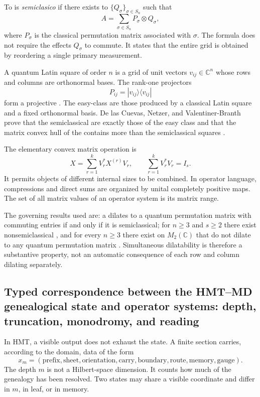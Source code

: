 To \QMS is \emph{semiclasico} if there exists to \POVM
\(\{Q_\sigma\}_{\sigma\in S_n}\) such that
\[
 A=\sum_{\sigma\in S_n}P_\sigma\otimes Q_\sigma,
 \tag{GMC-1.2}
\]
where $P_\sigma$ is the classical permutation matrix associated with
$\sigma$. The formula does not require the effects $Q_\sigma$ to commute. It states
that the entire grid is obtained by reordering a single primary measurement.

A quantum Latin square of order $n$ is a grid of unit
vectors $v_{ij}\in\mathbb C^n$ whose rows and columns are
orthonormal bases. The rank-one projectors
\[
 P_{ij}=|v_{ij}\rangle\langle v_{ij}|
\]
form a projective \QMS. The easy-class \QLS are those produced by a classical Latin
square and a fixed orthonormal basis. De las Cuevas, Netzer, and
Valentiner-Branth prove that the semiclassical \QLS are exactly those of
the easy class and that the matrix convex hull of the \QLS contains more than the
semiclassical squares \citep{delascuevas2023latin}.

The elementary convex matrix operation is
\[
 X=\sum_{r=1}^{k}V_r^*X^{(r)}V_r,
 \qquad
 \sum_{r=1}^{k}V_r^*V_r=I_s.
 \tag{GMC-1.3}
\]
It permits objects of different internal sizes to be combined. In operator
language, compressions and direct sums are organized by unital completely
positive maps. The set of all matrix values of an operator system is its
matrix range.

\begin{importbox}
The governing results used are: a \QMS dilates to a quantum
permutation matrix with commuting entries if and only if it is semiclassical;
for $n\ge3$ and $s\ge2$ there exist nonsemiclassical \QMS, and for every $n\ge3$ there exist
\QMS on $M_2(\mathbb C)$ that do not dilate to any quantum
permutation matrix \citep{delascuevas2020qms}. Simultaneous dilatability
is therefore a substantive property, not an automatic consequence of
each row and column dilating separately.
\end{importbox}

\subsection{Typed correspondence between the HMT–MD genealogical state and operator systems: depth, truncation, monodromy, and reading}

In HMT, a visible output does not exhaust the state. A finite section
carries, according to the domain, data of the form
\[
 x_m=(\text{prefix},\text{sheet},\text{orientation},\text{carry},
       \text{boundary},\text{route},\text{memory},\text{gauge}).
 \tag{GMC-1.4}
\]
The depth $m$ is not a Hilbert-space dimension. It counts how much of the
genealogy has been resolved. Two states may share a visible coordinate and
differ in $m$, in leaf, or in memory.

